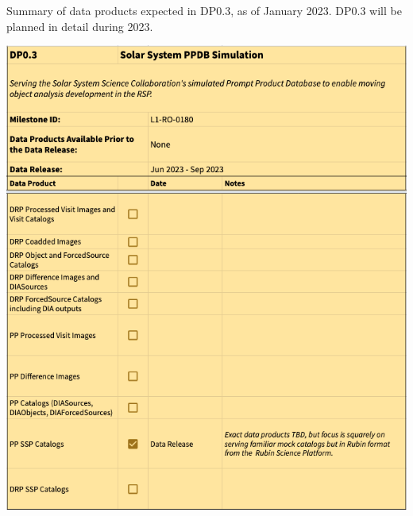 \begin{table}
\caption{Summary of data products expected in DP0.3, as of January 2023.
DP0.3 will be planned in detail during 2023.}
\label{tab:dp-zpthree-products}
\includegraphics[width=\linewidth]{figures/DP0_3-products}
\end{table}

